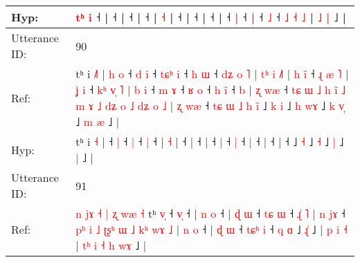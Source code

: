 \documentclass[10pt]{article}
\DeclareRobustCommand{\hl}[1]{{\textcolor{red}{#1}}}
\begin{document}
\begin{longtable}{ll}
 \\
Hyp: & \hl{}\hl{}\hl{}\hl{}\hl{}\hl{}\hl{}\hl{t}\hl{ʰ} \hl{i} ˧ |\hl{}\hl{}\hl{}\hl{} ˧\hl{}\hl{}\hl{}\hl{}\hl{}\hl{} |\hl{}\hl{}\hl{}\hl{} ˧\hl{}\hl{}\hl{}\hl{}\hl{}\hl{} |\hl{}\hl{}\hl{}\hl{} ˧\hl{}\hl{}\hl{}\hl{}\hl{}\hl{} |\hl{}\hl{}\hl{}\hl{}\hl{} \hl{}\hl{˧} |\hl{}\hl{}\hl{}\hl{} ˧ |\hl{}\hl{}\hl{}\hl{} ˧\hl{}\hl{}\hl{}\hl{}\hl{}\hl{} |\hl{}\hl{}\hl{}\hl{} ˧\hl{}\hl{}\hl{}\hl{}\hl{}\hl{} |\hl{}\hl{}\hl{}\hl{} ˧\hl{}\hl{} \hl{|} ˧\hl{}\hl{}\hl{}\hl{} \hl{|} ˧\hl{}\hl{} \hl{˩} ˧ \hl{˩} \hl{}\hl{˧} \hl{}\hl{˩} | \hl{˩} \hl{|} ˩ |
 \\
\midrule
Utterance ID: & 90 \\
Ref: & tʰ i \hl{˩}\hl{˥} |\hl{ }\hl{h}\hl{ }\hl{o} ˧\hl{ }\hl{d} \hl{i} ˧\hl{ }\hl{t}\hl{ɕ}\hl{ʰ} \hl{i} ˧\hl{ }\hl{h} \hl{ɯ} ˧\hl{ }\hl{d}\hl{ʑ}\hl{ }\hl{o}\hl{ }\hl{˥} |\hl{ }\hl{t}\hl{ʰ}\hl{ }\hl{i} \hl{˩}\hl{˥} |\hl{ }\hl{h}\hl{ }\hl{i}\hl{̃} ˧\hl{ }\hl{ɻ}\hl{ }\hl{æ}\hl{ }\hl{˥} |\hl{ }\hl{ʝ}\hl{ }\hl{i} ˧\hl{ }\hl{k}\hl{ʰ}\hl{ }\hl{v}\hl{̩}\hl{ }\hl{˥} |\hl{ }\hl{b}\hl{ }\hl{i} ˧\hl{ }\hl{m} \hl{ɤ} ˧\hl{ }\hl{ʁ} \hl{o} ˧\hl{ }\hl{h} \hl{i}\hl{̃} ˧\hl{ }\hl{b} |\hl{ }\hl{ʐ}\hl{ }\hl{w}\hl{æ} ˧\hl{ }\hl{t}\hl{ɕ}\hl{ }\hl{ɯ}\hl{ }\hl{˩}\hl{ }\hl{h}\hl{ }\hl{i}\hl{̃}\hl{ }\hl{˩}\hl{ }\hl{m}\hl{ }\hl{ɤ}\hl{ }\hl{˩}\hl{ }\hl{d}\hl{ʑ}\hl{ }\hl{o}\hl{ }\hl{˩}\hl{ }\hl{d}\hl{ʑ}\hl{ }\hl{o}\hl{ }\hl{˩} |\hl{ }\hl{ʐ}\hl{ }\hl{w}\hl{æ} ˧\hl{ }\hl{t}\hl{ɕ}\hl{ }\hl{ɯ}\hl{ }\hl{˩}\hl{ }\hl{h}\hl{ }\hl{i}\hl{̃} ˩\hl{ }\hl{k} \hl{i} ˩\hl{ }\hl{h} \hl{w}\hl{ɤ} ˩\hl{ }\hl{k} \hl{v}\hl{̩} ˩\hl{ }\hl{m} \hl{æ} ˩ |
 \\
Hyp: & tʰ i \hl{}\hl{˧} |\hl{}\hl{}\hl{}\hl{} ˧\hl{}\hl{} \hl{|} ˧\hl{}\hl{}\hl{}\hl{} \hl{|} ˧\hl{}\hl{} \hl{|} ˧\hl{}\hl{}\hl{}\hl{}\hl{}\hl{}\hl{} |\hl{}\hl{}\hl{}\hl{}\hl{} \hl{}\hl{˧} |\hl{}\hl{}\hl{}\hl{}\hl{} ˧\hl{}\hl{}\hl{}\hl{}\hl{}\hl{} |\hl{}\hl{}\hl{}\hl{} ˧\hl{}\hl{}\hl{}\hl{}\hl{}\hl{}\hl{}\hl{} |\hl{}\hl{}\hl{}\hl{} ˧\hl{}\hl{} \hl{|} ˧\hl{}\hl{} \hl{|} ˧\hl{}\hl{} \hl{}\hl{|} ˧\hl{}\hl{} |\hl{}\hl{}\hl{}\hl{}\hl{} ˧\hl{}\hl{}\hl{}\hl{}\hl{}\hl{}\hl{}\hl{}\hl{}\hl{}\hl{}\hl{}\hl{}\hl{}\hl{}\hl{}\hl{}\hl{}\hl{}\hl{}\hl{}\hl{}\hl{}\hl{}\hl{}\hl{}\hl{}\hl{}\hl{}\hl{}\hl{}\hl{}\hl{}\hl{} |\hl{}\hl{}\hl{}\hl{}\hl{} ˧\hl{}\hl{}\hl{}\hl{}\hl{}\hl{}\hl{}\hl{}\hl{}\hl{}\hl{}\hl{} ˩\hl{}\hl{} \hl{˧} ˩\hl{}\hl{} \hl{}\hl{˧} ˩\hl{}\hl{} \hl{}\hl{|} ˩\hl{}\hl{} \hl{|} ˩ |
 \\
\midrule
Utterance ID: & 91 \\
Ref: & \hl{n}\hl{ }\hl{j}\hl{ɤ}\hl{ }\hl{˧}\hl{ }\hl{|}\hl{ }\hl{ʐ}\hl{ }\hl{w}\hl{æ}\hl{ }\hl{˧}\hl{ }tʰ \hl{v}\hl{̩} ˧ \hl{v}\hl{̩} ˧ |\hl{ }\hl{n}\hl{ }\hl{o} ˧ |\hl{ }\hl{ɖ}\hl{ }\hl{ɯ} ˧\hl{ }\hl{t}\hl{ɕ} \hl{ɯ} ˧\hl{ }\hl{ɻ}\hl{̍}\hl{ }\hl{˥} |\hl{ }\hl{n}\hl{ }\hl{j}\hl{ɤ} ˧\hl{ }\hl{p}\hl{ʰ}\hl{ }\hl{i}\hl{ }\hl{˩}\hl{ }\hl{ʈ}\hl{ʂ}\hl{ʰ}\hl{ }\hl{ɯ}\hl{ }\hl{˩}\hl{ }\hl{k}\hl{ʰ}\hl{ }\hl{w}\hl{ɤ}\hl{ }\hl{˩} |\hl{ }\hl{n}\hl{ }\hl{o} ˧ | \hl{ɖ} \hl{ɯ} ˧\hl{ }\hl{t}\hl{ɕ}\hl{ʰ} \hl{i} ˧ \hl{q} \hl{ɑ} ˩ \hl{ɻ}\hl{̍} ˩ |\hl{ }\hl{p}\hl{ }\hl{i} \hl{˧} |\hl{ }\hl{t}\hl{ʰ}\hl{ }\hl{i}\hl{ }\hl{˧}\hl{ }\hl{h}\hl{ }\hl{w}\hl{ɤ} ˩ |

\end{longtable}
\end{document}
